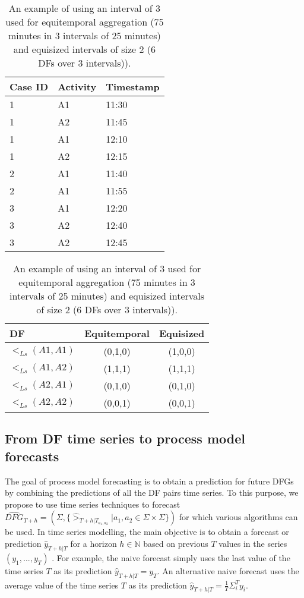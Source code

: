 \begin{table}[htbp]
   \begin{minipage}{.5\textwidth}
   	\centering
    \begin{tabular}{|l|l|l|}
    \toprule
    {Case ID} & Activity &Timestamp \\
    \midrule
    1     & A1    & 11:30 \\
    1     & A2    & 11:45 \\
    1     & A1    & 12:10 \\
    1     & A2    & 12:15 \\
    \midrule
    2     & A1    & 11:40 \\
    2     & A1    & 11:55 \\
    \midrule
    3     & A1    & 12:20 \\
    3     & A2    & 12:40 \\
    3     & A2    & 12:45 \\
    \bottomrule
    \end{tabular}
    \caption{Example event log with 3 traces and 2 activities.}
\label{tab:eventlog}
\end{minipage}
  \begin{minipage}{.5\textwidth}
  	\centering
    \begin{tabular}{|l|c|c|}
    \toprule
    DF    & Equitemporal  & Equisized \\
    \midrule
    $<_{Ls}(A1,A1)$ & (0,1,0) & (1,0,0) \\
    $<_{Ls}(A1,A2)$ & (1,1,1) & (1,1,1) \\
    $<_{Ls}(A2,A1)$ & (0,1,0) & (0,1,0) \\
    $<_{Ls}(A2,A2)$ & (0,0,1) & (0,0,1) \\
    \bottomrule
    \end{tabular}
  \caption{An example of using an interval of 3 used for equitemporal aggregation (75 minutes in 3 intervals of 25 minutes) and equisized intervals of size 2 (6 DFs over 3 intervals)).}
  \label{tab:aggregation}
 \end{minipage}%
\end{table}%

\subsection{From DF time series to process model forecasts}\label{sec:3b:df}

The goal of process model forecasting is to obtain a prediction for future DFGs by combining the predictions of all the DF pairs time series.
To this purpose, we propose to use time series techniques to forecast $\widehat{DFG}_{T+h}=(\Sigma,\{\hat{>}_{T+h|T_{a_1,a_2}}|a_1,a_2\in \Sigma\times\Sigma\})$ for which various algorithms can be used.
In time series modelling, the main objective is to obtain a forecast or prediction $\hat{y}_{T+h|T}$ for a horizon $h\in \mathbb{N}$ based on previous $T$ values in the series $(y_1,...,y_T)$ \cite{hyndman2018forecasting}.
For example, the naive forecast simply uses the last value of the time series $T$ as its prediction $\hat{y}_{T+h|T}=y_T$.
An alternative naive forecast uses the average value of the time series $T$ as its prediction $\hat{y}_{T+h|T}=\frac{1}{T}\Sigma_i^{T} y_i$.

